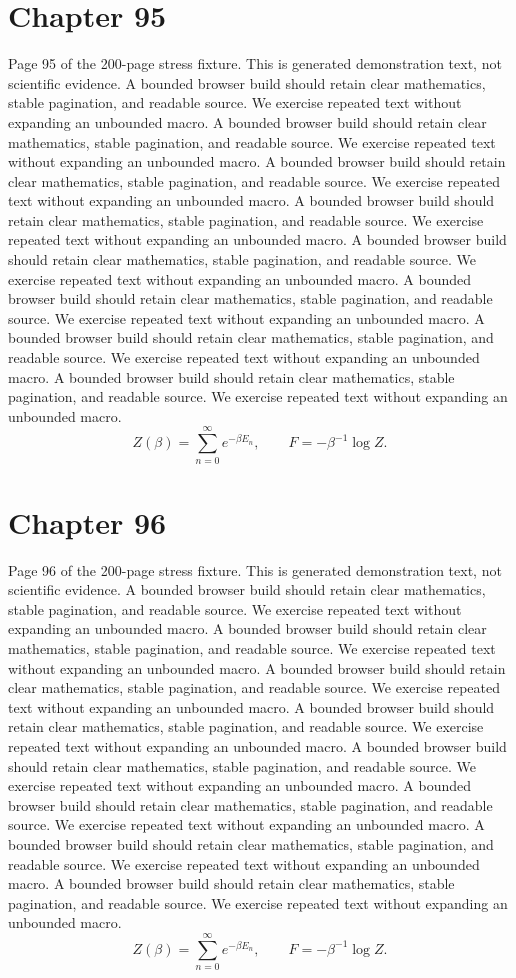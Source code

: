 \documentclass[11pt]{article}
\begin{document}
\section*{Chapter 95}
Page 95 of the 200-page stress fixture. This is generated demonstration text, not scientific evidence.
A bounded browser build should retain clear mathematics, stable pagination, and readable source. We exercise repeated text without expanding an unbounded macro.
A bounded browser build should retain clear mathematics, stable pagination, and readable source. We exercise repeated text without expanding an unbounded macro.
A bounded browser build should retain clear mathematics, stable pagination, and readable source. We exercise repeated text without expanding an unbounded macro.
A bounded browser build should retain clear mathematics, stable pagination, and readable source. We exercise repeated text without expanding an unbounded macro.
A bounded browser build should retain clear mathematics, stable pagination, and readable source. We exercise repeated text without expanding an unbounded macro.
A bounded browser build should retain clear mathematics, stable pagination, and readable source. We exercise repeated text without expanding an unbounded macro.
A bounded browser build should retain clear mathematics, stable pagination, and readable source. We exercise repeated text without expanding an unbounded macro.
A bounded browser build should retain clear mathematics, stable pagination, and readable source. We exercise repeated text without expanding an unbounded macro.
\[Z(\beta)=\sum_{n=0}^{\infty}e^{-\beta E_n},\qquad F=-\beta^{-1}\log Z.\]
\newpage
\section*{Chapter 96}
Page 96 of the 200-page stress fixture. This is generated demonstration text, not scientific evidence.
A bounded browser build should retain clear mathematics, stable pagination, and readable source. We exercise repeated text without expanding an unbounded macro.
A bounded browser build should retain clear mathematics, stable pagination, and readable source. We exercise repeated text without expanding an unbounded macro.
A bounded browser build should retain clear mathematics, stable pagination, and readable source. We exercise repeated text without expanding an unbounded macro.
A bounded browser build should retain clear mathematics, stable pagination, and readable source. We exercise repeated text without expanding an unbounded macro.
A bounded browser build should retain clear mathematics, stable pagination, and readable source. We exercise repeated text without expanding an unbounded macro.
A bounded browser build should retain clear mathematics, stable pagination, and readable source. We exercise repeated text without expanding an unbounded macro.
A bounded browser build should retain clear mathematics, stable pagination, and readable source. We exercise repeated text without expanding an unbounded macro.
A bounded browser build should retain clear mathematics, stable pagination, and readable source. We exercise repeated text without expanding an unbounded macro.
\[Z(\beta)=\sum_{n=0}^{\infty}e^{-\beta E_n},\qquad F=-\beta^{-1}\log Z.\]
\newpage
\end{document}
